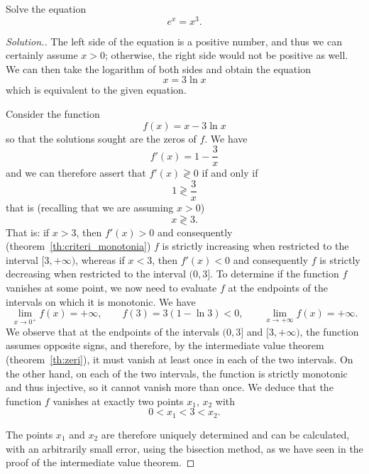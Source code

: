 \begin{exercise}
Solve the equation
\begin{equation} \label{eq:4734521}
  e^x = x^3.
\end{equation}
\end{exercise}
%
\begin{proof}[Solution.]
The left side of the equation is a positive number, and thus we can certainly
assume $x>0$; otherwise, the right side would not be positive as well. We can
then take the logarithm of both sides and obtain the equation
\[
  x = 3 \ln x
\]
which is equivalent to the given equation.

Consider the function
\[
 f(x) = x - 3 \ln x
\]
so that the solutions sought are the zeros of $f$. We have
\[
  f'(x) = 1 - \frac{3}{x}
\]
and we can therefore assert that
%
$f'(x) \gtrless 0$
if and only if
\[
  1 \gtrless \frac 3 x
\]
that is (recalling that we are assuming $x>0$)
\[
  x \gtrless 3.
\]
That is: if $x>3$, then $f'(x)>0$ and consequently
(theorem~\ref{th:criteri_monotonia}) $f$ is strictly increasing when restricted
to the interval $[3,+\infty)$, whereas if $x<3$, then $f'(x)<0$ and consequently
$f$ is strictly decreasing when restricted to the interval $(0,3]$. To determine
if the function $f$ vanishes at some point, we now need to evaluate $f$ at the
endpoints of the intervals on which it is monotonic. We have
\[
  \lim_{x\to 0^+} f(x) = +\infty, \qquad
  f(3) = 3 (1 - \ln 3) <0, \qquad
  \lim_{x\to +\infty} f(x) = +\infty.
\]
We observe that at the endpoints of the intervals $(0,3]$ and $[3,+\infty)$, the
function assumes opposite signs, and therefore, by the intermediate value
theorem (theorem~\ref{th:zeri}), it must vanish at least once in each of the two
intervals. On the other hand, on each of the two intervals, the function is
strictly monotonic and thus injective, so it cannot vanish more than once. We
deduce that the function $f$ vanishes at exactly two points $x_1$, $x_2$ with
\[
  0 < x_1 < 3 < x_2.
\]

The points $x_1$ and $x_2$ are therefore uniquely determined and can be
calculated, with an arbitrarily small error, using the bisection method, as we
have seen in the proof of the intermediate value theorem.
\end{proof}

